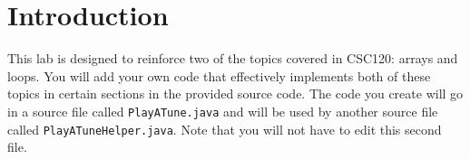 
\section{Introduction}
This lab is designed to reinforce two of the topics covered in CSC120: arrays and loops. You will add your own code that effectively implements both of these topics in certain sections in the provided source code. The code you create will go in a source file called {\tt PlayATune.java} and will be used by another source file called {\tt PlayATuneHelper.java}.  Note that you will not have to edit this second file.

